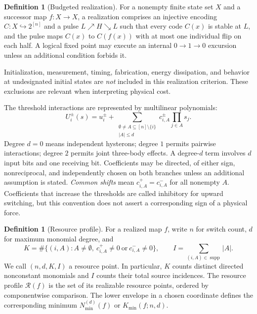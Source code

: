 \documentclass[12pt,letterpaper]{article}
\theoremstyle{definition}\newtheorem{definition}[theorem]{Definition}
\theoremstyle{remark}\newtheorem{remark}[theorem]{Remark}
\newcommand{\Nmin}{N_{\min}}
\newcommand{\Kmin}{K_{\min}}
\newcommand{\supp}{\operatorname{supp}}
\begin{document}
\begin{definition}[Budgeted realization]
For a nonempty finite state set $X$ and a successor map $f:X\to X$, a realization comprises an injective encoding $C:X\hookrightarrow 2^{[n]}$ and a pulse $L\nearrow H\searrow L$ such that every code $C(x)$ is stable at $L$, and the pulse maps $C(x)$ to $C(f(x))$ with at most one individual flip on each half. A logical fixed point may execute an internal $0\to1\to0$ excursion unless an additional condition forbids it.
\end{definition}
Initialization, measurement, timing, fabrication, energy dissipation, and behavior at undesignated initial states are \emph{not} included in this realization criterion. These exclusions are relevant when interpreting physical cost.

The threshold interactions are represented by multilinear polynomials:
\begin{equation}\label{eq:poly}
 U_i^{\pm}(s)=u_i^{\pm}+\sum_{\substack{\emptyset\ne A\subseteq[n]\setminus\{i\}\\|A|\le d}}
 c_{i,A}^{\pm}\prod_{j\in A}s_j.
\end{equation}
Degree $d=0$ means independent hysterons; degree $1$ permits pairwise interactions; degree $2$ permits joint three-body effects. A degree-$d$ term involves $d$ input bits and one receiving bit. Coefficients may be directed, of either sign, nonreciprocal, and independently chosen on both branches unless an additional assumption is stated. \emph{Common shifts} mean $c^+_{i,A}=c^-_{i,A}$ for all nonempty $A$. Coefficients that increase the thresholds are called inhibitory for upward switching, but this convention does not assert a corresponding sign of a physical force.

\begin{definition}[Resource profile]
For a realized map $f$, write $n$ for switch count, $d$ for maximum monomial degree, and
\begin{equation}\label{eq:costs}
 K=\#\{(i,A):A\ne\emptyset,\ c^+_{i,A}\ne0\ \text{or}\ c^-_{i,A}\ne0\},\qquad
 I=\sum_{(i,A)\in\supp}|A|.
\end{equation}
We call $(n,d,K,I)$ a resource point. In particular, $K$ counts distinct directed nonconstant monomials and $I$ counts their total source incidences. The resource profile $\mathcal R(f)$ is the set of its realizable resource points, ordered by componentwise comparison. The lower envelope in a chosen coordinate defines the corresponding minimum $\Nmin^{(d)}(f)$ or $\Kmin(f;n,d)$.
\end{definition}
\end{document}
